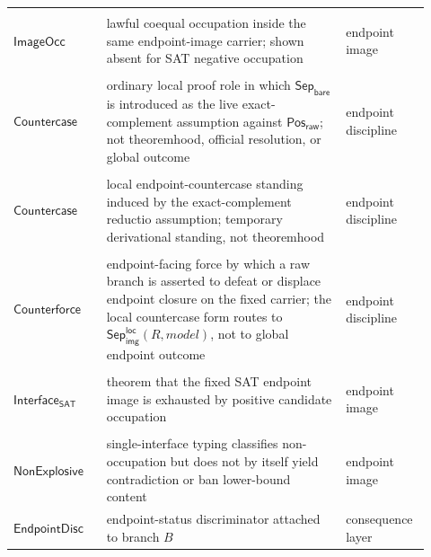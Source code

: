 \documentclass[11pt]{article}
\theoremstyle{definition}
\theoremstyle{remark}
\newcommand{\PosRaw}{\mathsf{Pos}_{\mathsf{raw}}}
\newcommand{\SepBare}{\mathsf{Sep}_{\mathsf{bare}}}
\newcommand{\LocalSepImgOcc}{\mathsf{Sep}_{\mathsf{img}}^{\mathsf{loc}}}
\newcommand{\EndpointDisc}{\mathsf{EndpointDisc}}
\begin{document}
\begin{longtable}{>{\raggedright\arraybackslash}p{0.21\linewidth}>{\raggedright\arraybackslash}p{0.54\linewidth}>{\raggedright\arraybackslash}p{0.17\linewidth}}
\begin{tabular}[t]{@{}l@{}}\(\mathsf{LawfulCoequal}\)\\\(\mathsf{ImageOcc}\)\end{tabular} & lawful coequal occupation inside the same endpoint-image carrier; shown absent for SAT negative occupation & endpoint image \\
\begin{tabular}[t]{@{}l@{}}\(\mathsf{Reductio}\)\\\(\mathsf{Countercase}\)\end{tabular} & ordinary local proof role in which \(\SepBare\) is introduced as the live exact-complement assumption against \(\PosRaw\); not theoremhood, official resolution, or global outcome & endpoint discipline \\
\begin{tabular}[t]{@{}l@{}}\(\mathsf{Local}\)\\\(\mathsf{Countercase}\)\end{tabular} & local endpoint-countercase standing induced by the exact-complement reductio assumption; temporary derivational standing, not theoremhood & endpoint discipline \\
\begin{tabular}[t]{@{}l@{}}\(\mathsf{Endpoint}\)\\\(\mathsf{Counterforce}\)\end{tabular} & endpoint-facing force by which a raw branch is asserted to defeat or displace endpoint closure on the fixed carrier; the local countercase form routes to \(\LocalSepImgOcc(R,model)\), not to global endpoint outcome & endpoint discipline \\
\begin{tabular}[t]{@{}l@{}}\(\mathsf{SingleOcc}\)\\\(\mathsf{Interface}_{\mathsf{SAT}}\)\end{tabular} & theorem that the fixed SAT endpoint image is exhausted by positive candidate occupation & endpoint image \\
\begin{tabular}[t]{@{}l@{}}\(\mathsf{SingleInterface}\)\\\(\mathsf{NonExplosive}\)\end{tabular} & single-interface typing classifies non-occupation but does not by itself yield contradiction or ban lower-bound content & endpoint image \\
\(\EndpointDisc\) & endpoint-status discriminator attached to branch \(B\) & consequence layer \\

\end{longtable}
\end{document}
